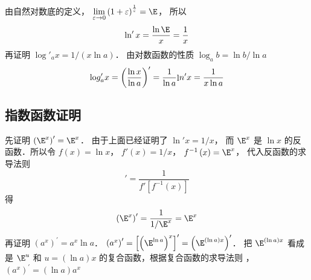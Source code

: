 由自然对数底的定义， $\mathop {\lim }\limits_{\varepsilon  \to 0} {\left( {1 + \varepsilon } \right)^{\frac{1}{\varepsilon }}} = \E$， 所以
 \begin{equation}
\ln 'x = \frac{{\ln \E}}{x} = \frac{1}{x}
\end{equation}
再证明 ${\log'_a}x = {1}/{(x\ln a)}$． 
由对数函数的性质 ${\log _a}b = {{\ln b}}/{{\ln a}}$
\begin{equation}
{\mathop{\rm lo}\nolimits} {g'_a}x = {\left( {\frac{{\ln x}}{{\ln a}}} \right)^\prime } = \frac{1}{{\ln a}}{\mathop{\rm l}\nolimits} n'x = \frac{1}{{x\ln a}}
\end{equation}

\subsection{指数函数证明}
先证明 ${\left( {{\E^x}} \right)^\prime } = {\E^x}$． 
由于上面已经证明了 $ \ln'x = {1}/{x}$， 而 ${\E^x}$ 是 $\ln x$ 的反函数．所以令 $f\left( x \right) = \ln x$， $f'\left( x \right) = 1/x$，  ${f^{ - 1}}\left( x \right) = {\E^x}$， 代入反函数的求导法则%
\begin{equation}
[{f^{ - 1}}\left( x \right)]' = \frac{1}{{f'[{{f^{ - 1}}(x)} ]}} 
\end{equation} 
得
\begin{equation}
{\left( {{\E^x}} \right)^\prime } = \frac{1}{{1/{\E^x}}} = {\E^x} 
\end{equation}
再证明 ${\left( {{a^x}} \right)^\prime } = {a^x}\ln a$．  ${\left( {{a^x}} \right)^\prime } = {\left[ {{{\left( {{\E^{\ln a}}} \right)}^x}} \right]^\prime } = {\left( {{\E^{\left( {\ln a} \right)x}}} \right)^\prime }$． 把 ${\E^{\left( {\ln a} \right)x}}$ 看成是 ${\E^u}$ 和 $u = \left( {\ln a} \right)x$ 的复合函数，根据复合函数的求导法则%
， ${\left( {{a^x}} \right)^\prime } = \left( {\ln a} \right){a^x}$ 



















